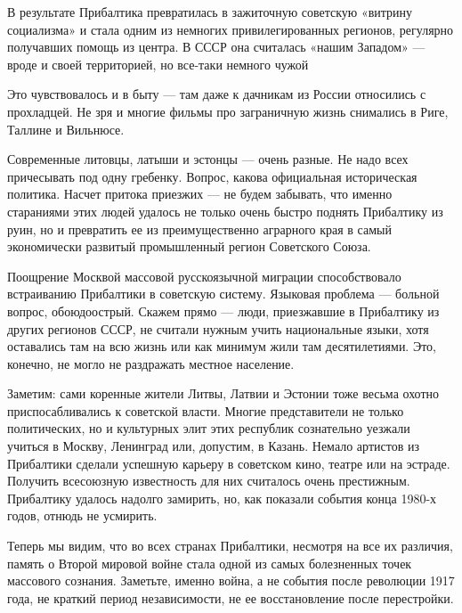 \begin{leftbar}
				\large
В результате Прибалтика превратилась в зажиточную советскую
«витрину социализма» и стала одним из немногих привилегированных
регионов, регулярно получавших помощь из центра. В СССР она считалась
«нашим Западом» — вроде и своей территорией, но все-таки немного чужой
\end{leftbar}

Это чувствовалось и в быту — там даже к дачникам из России относились с
прохладцей. Не зря и многие фильмы про заграничную жизнь снимались в Риге,
Таллине и Вильнюсе.


Современные литовцы, латыши и эстонцы — очень разные. Не надо всех причесывать
под одну гребенку. Вопрос, какова официальная историческая политика. Насчет
притока приезжих — не будем забывать, что именно стараниями этих людей удалось
не только очень быстро поднять Прибалтику из руин, но и превратить ее из
преимущественно аграрного края в самый экономически развитый промышленный
регион Советского Союза.

Поощрение Москвой массовой русскоязычной миграции способствовало встраиванию
Прибалтики в советскую систему. Языковая проблема — больной вопрос,
обоюдоострый. Скажем прямо — люди, приезжавшие в Прибалтику из других регионов
СССР, не считали нужным учить национальные языки, хотя оставались там на всю
жизнь или как минимум жили там десятилетиями. Это, конечно, не могло не
раздражать местное население.

Заметим: сами коренные жители Литвы, Латвии и Эстонии тоже весьма охотно
приспосабливались к советской власти. Многие представители не только
политических, но и культурных элит этих республик сознательно уезжали учиться в
Москву, Ленинград или, допустим, в Казань. Немало артистов из Прибалтики
сделали успешную карьеру в советском кино, театре или на эстраде. Получить
всесоюзную известность для них считалось очень престижным. Прибалтику удалось
надолго замирить, но, как показали события конца 1980-х годов, отнюдь не
усмирить.

Теперь мы видим, что во всех странах Прибалтики, несмотря на все их различия,
память о Второй мировой войне стала одной из самых болезненных точек массового
сознания. Заметьте, именно война, а не события после революции 1917 года, не
краткий период независимости, не ее восстановление после перестройки.

